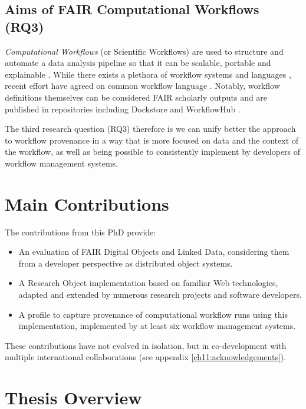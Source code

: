 \subsection{Aims of FAIR Computational Workflows (RQ3)}

\emph{Computational Workflows} (or Scientific Workflows) are used to structure and automate a data analysis pipeline so that it can be scalable, portable and explainable \cite{Atkinson 2017,Leipzig 2021}. While there exists a plethora of workflow systems and languages \cite{ch8-43}, recent effort have agreed on common workflow language \cite{Crusoe 2022}. Notably, workflow definitions themselves can be considered FAIR scholarly outputs \cite{Goble 2020} and are published in repositories including Dockstore \cite{Yuen 2021} and WorkflowHub \cite{Goble 2021}.


The third research question (RQ3) therefore is we can unify better the approach to workflow provenance in a way that is more focused on data and the context of the workflow, as well as being possible to consistently implement by developers of workflow management systems.


\section{Main Contributions}

The contributions from this PhD provide:

\begin{itemize}
    \item An evaluation of FAIR Digital Objects and Linked Data, considering them from a developer perspective as distributed object systems.
    \item A Research Object implementation based on familiar Web technologies, adapted and extended by numerous research projects and software developers.
    \item A profile to capture provenance of computational workflow runs using this implementation, implemented by at least six workflow management systems.
\end{itemize}

These contributions have not evolved in isolation, but in co-development with multiple international collaborations (see appendix \vref{ch11:acknowledgements}).


\section{Thesis Overview}

